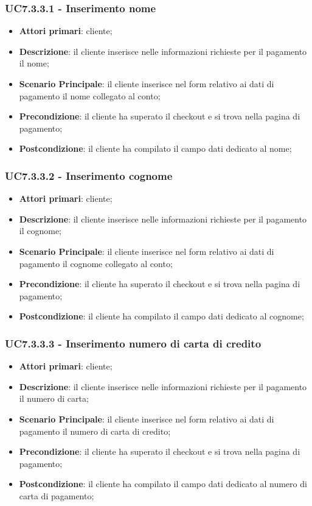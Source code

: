 \subsubsection{UC7.3.3.1 - Inserimento nome}
\begin{itemize}
\item \textbf{Attori primari}: cliente;
\item \textbf{Descrizione}: il cliente inserisce nelle informazioni richieste per il pagamento il nome;
\item \textbf{Scenario Principale}: il cliente inserisce nel form relativo ai dati di pagamento il nome collegato al conto;
\item \textbf{Precondizione}: il cliente ha superato il checkout e si trova nella pagina di pagamento;
\item \textbf{Postcondizione}: il cliente ha compilato il campo dati dedicato al nome;
\end{itemize}

\subsubsection{UC7.3.3.2 - Inserimento cognome}
\begin{itemize}
\item \textbf{Attori primari}: cliente;
\item \textbf{Descrizione}: il cliente inserisce nelle informazioni richieste per il pagamento il cognome;
\item \textbf{Scenario Principale}: il cliente inserisce nel form relativo ai dati di pagamento il cognome collegato al conto;
\item \textbf{Precondizione}: il cliente ha superato il checkout e si trova nella pagina di pagamento;
\item \textbf{Postcondizione}: il cliente ha compilato il campo dati dedicato al cognome;
\end{itemize}

\subsubsection{UC7.3.3.3 - Inserimento numero di carta di credito}
\begin{itemize}
\item \textbf{Attori primari}: cliente;
\item \textbf{Descrizione}: il cliente inserisce nelle informazioni richieste per il pagamento il numero di carta;
\item \textbf{Scenario Principale}: il cliente inserisce nel form relativo ai dati di pagamento il numero di carta di credito;
\item \textbf{Precondizione}: il cliente ha superato il checkout e si trova nella pagina di pagamento;
\item \textbf{Postcondizione}: il cliente ha compilato il campo dati dedicato al numero di carta di pagamento;
\end{itemize}

